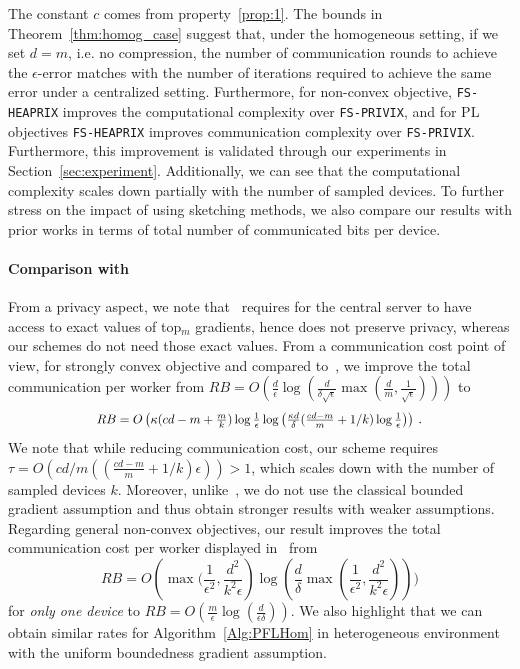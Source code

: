\documentclass[sigconf, anonymous, review]{acmart}
\newcommand*{\Resize}[2]{\resizebox{#1}{!}{$#2$}}%
\begin{document}
The constant $c$ comes from property~\ref{prop:1}. The bounds in Theorem~\ref{thm:homog_case} suggest that, under the homogeneous setting, if we set $d=m$, i.e. no compression, the number of communication rounds to achieve the $\epsilon$-error matches with the number of iterations required to achieve the same error under a centralized setting. 
Furthermore, for non-convex objective, \texttt{FS-HEAPRIX} improves the computational complexity over \texttt{FS-PRIVIX}, and for PL objectives \texttt{FS-HEAPRIX} improves communication complexity over \texttt{FS-PRIVIX}. Furthermore, this improvement is validated through our experiments in Section~\ref{sec:experiment}.   
Additionally, we can see that the computational complexity scales down partially with the number of sampled devices. 
To further stress on the impact of using sketching methods, we also compare our results with prior works in terms of total number of communicated bits per device. 

\paragraph{Comparison with~\citep{ivkin2019communication}}
From a privacy aspect, we note that~\citep{ivkin2019communication} requires for the central server to have access to exact values of top$_m$ gradients, hence does not preserve privacy, whereas our schemes do not need those exact values. 
From a communication cost point of view, for strongly convex objective and compared to~\citep{ivkin2019communication}, we improve the total communication per worker from 
$RB=O\left(\frac{ d}{\epsilon}\log\left(\frac{d}{\delta\sqrt{\epsilon}}\max\left(\frac{ d}{m},\frac{1}{\sqrt{\epsilon}}\right)\right)\right)$ to 
\[ \Resize{8cm}{RB=O\left(\kappa(cd-m+\frac{m}{k})\log\frac{1}{\epsilon}\log\left(\frac{\kappa d}{\delta}(\frac{cd-m}{m}+1/k)\log\frac{1}{\epsilon}\right)\right)}\ .\]
We note that while reducing communication cost, our scheme requires $\tau=O(cd/m((\frac{ cd-m}{m}+1/k)\epsilon))>1$, which scales down with the number of sampled devices $k$. 
Moreover, unlike~\citep{ivkin2019communication}, we do not use the classical bounded gradient assumption and thus obtain stronger results with weaker assumptions. 
Regarding general non-convex objectives, our result improves the total communication cost per worker displayed in~\cite{ivkin2019communication} from $$RB=O\left(\max(\frac{1}{\epsilon^2},\frac{d^2}{k^2\epsilon}\right)\log(\frac{d}{\delta}\max(\frac{1}{\epsilon^2},\frac{d^2}{k^2\epsilon})))$$ for \emph{only one device} to $RB=O(\frac{m}{\epsilon}\log(\frac{d}{\epsilon\delta}))$. 
We also highlight that we can obtain similar rates for Algorithm~\ref{Alg:PFLHom} in heterogeneous environment with the uniform boundedness gradient assumption.
\end{document}
